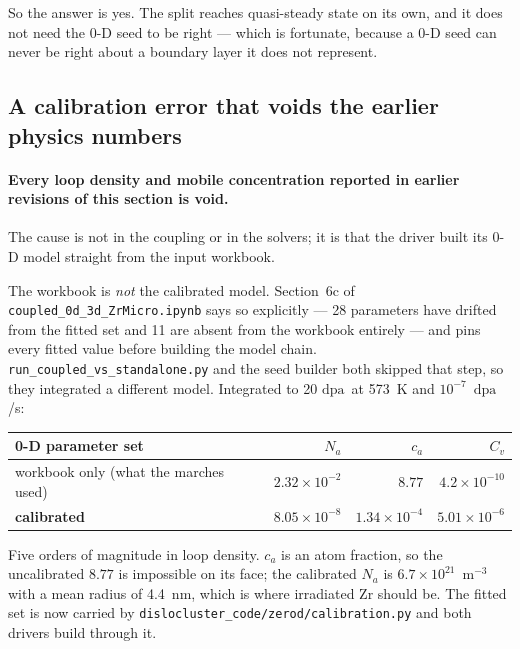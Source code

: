 \documentclass[11pt,a4paper]{article}
\newcommand{\code}[1]{\texttt{\small #1}}
\newcommand{\dpa}{\ensuremath{\mathrm{dpa}}}
\begin{document}
So the answer is yes. The split reaches quasi-steady state on its own, and it
does not need the 0-D seed to be right --- which is fortunate, because a 0-D
seed can never be right about a boundary layer it does not represent.

\subsection{A calibration error that voids the earlier physics numbers}
\label{sec:calibration}

\paragraph{Every loop density and mobile concentration reported in earlier
revisions of this section is void.} The cause is not in the coupling or in the
solvers; it is that the driver built its 0-D model straight from the input
workbook.

The workbook is \emph{not} the calibrated model. Section~6c of
\code{coupled\_0d\_3d\_ZrMicro.ipynb} says so explicitly --- 28 parameters have
drifted from the fitted set and 11 are absent from the workbook entirely --- and
pins every fitted value before building the model chain.
\code{run\_coupled\_vs\_standalone.py} and the seed builder both skipped that
step, so they integrated a different model. Integrated to 20 \dpa\ at 573~K and
$10^{-7}$~\dpa/s:

\begin{center}
\begin{tabular}{lrrr}
\toprule
0-D parameter set & $N_a$ & $c_a$ & $C_v$ \\
\midrule
workbook only (what the marches used) & $2.32\times10^{-2}$ & $8.77$ & $4.2\times10^{-10}$ \\
\textbf{calibrated} & $8.05\times10^{-8}$ & $1.34\times10^{-4}$ & $5.01\times10^{-6}$ \\
\bottomrule
\end{tabular}
\end{center}

\noindent
Five orders of magnitude in loop density. $c_a$ is an atom fraction, so the
uncalibrated $8.77$ is impossible on its face; the calibrated $N_a$ is
$6.7\times10^{21}$~m$^{-3}$ with a mean radius of 4.4~nm, which is where
irradiated Zr should be. The fitted set is now carried by
\code{dislocluster\_code/zerod/calibration.py} and both drivers build through it.
\end{document}
